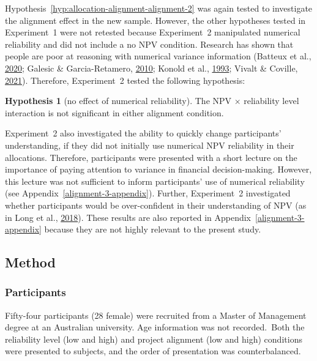 \documentclass[
  english,
  man, donotrepeattitle,floatsintext]{apa7}
\theoremstyle{definition}
\theoremstyle{definition}
\theoremstyle{definition}
\theoremstyle{definition}
\newtheorem{hypothesis}{Hypothesis}
\theoremstyle{remark}
\begin{document}
Hypothesis~\ref{hyp:allocation-alignment-alignment-2} was again tested to
investigate the alignment effect in the new sample. However, the other
hypotheses tested in Experiment~1 were not retested because Experiment~2
manipulated numerical reliability and did not include a no NPV condition.
Research has shown that people are poor at reasoning with numerical variance
information (Batteux et al., \protect\hyperlink{ref-batteux2020}{2020}; Galesic \& Garcia-Retamero, \protect\hyperlink{ref-galesic2010}{2010}; Konold et al., \protect\hyperlink{ref-konold1993}{1993}; Vivalt \& Coville, \protect\hyperlink{ref-vivalt2021}{2021}). Therefore,
Experiment~2 tested the following hypothesis:

\begin{hypothesis}[no effect of numerical reliability]
\protect\hypertarget{hyp:allocation-npv-reliability-alignment-3}{}{\label{hyp:allocation-npv-reliability-alignment-3} \iffalse (no effect of numerical reliability) \fi{} }The NPV \(\times\) reliability level interaction is not significant in either
alignment condition.
\end{hypothesis}

Experiment~2 also investigated the ability to quickly change participants'
understanding, if they did not initially use numerical NPV reliability in their
allocations. Therefore, participants were presented with a short lecture on the
importance of paying attention to variance in financial decision-making.
However, this lecture was not sufficient to inform participants' use of
numerical reliability (see Appendix~\ref{alignment-3-appendix}). Further,
Experiment~2 investigated whether participants would be over-confident in their
understanding of NPV (as in Long et al., \protect\hyperlink{ref-long2018}{2018}). These results are also reported in
Appendix~\ref{alignment-3-appendix} because they are not highly relevant to
the present study.

\hypertarget{method-alignment-2}{%
\subsection{Method}\label{method-alignment-2}}

\hypertarget{participants-1}{%
\subsubsection{Participants}\label{participants-1}}

Fifty-four participants (28 female) were recruited from a Master of Management degree at an Australian university. Age information was not recorded.~Both the reliability level (low and high) and
project alignment (low and high) conditions were presented to subjects, and the
order of presentation was counterbalanced.
\end{document}
